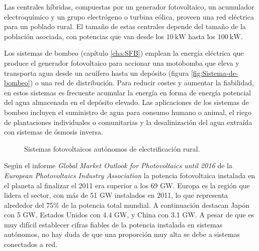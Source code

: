 Las centrales híbridas, compuestas por
un generador fotovoltaico, un acumulador electroquímico y un grupo
electrógeno o turbina eólica, proveen una red eléctrica para un poblado
rural. El tamaño de estas centrales depende del tamaño de la población
asociada, con potencias que van desde los $\SI{10}{\kilo\watt}$ hasta
los $\SI{100}{\kilo\watt}$. 

Los sistemas de bombeo (capítulo \ref{cha:SFB})
 emplean la energía eléctrica que produce el generador fotovoltaico
para accionar una motobomba que eleva y transporta agua desde un acuífero
hasta un depósito (figura \ref{fig:Sistema-de-bombeo}) o una red
de distribución. Para reducir costes y aumentar la fiabilidad, en
estos sistemas es frecuente acumular la energía en forma de energía
potencial del agua almacenada en el depósito elevado. Las aplicaciones
de los sistemas de bombeo incluyen el suministro de agua para consumo
humano o animal, el riego de plantaciones individuales o comunitarias
y la desalinización del agua extraída con sistemas de ósmosis inversa.

%
\begin{figure}

\caption{Sistemas fotovoltaicos autónomos de electrificación rural.}



\end{figure}


Según el informe \emph{Global Market Outlook for Photovoltaics until
2016} de la \emph{European Photovoltaics Industry Association}
\citep{EPIA2012} la potencia fotovoltaica instalada en el planeta
al finalizar el 2011 era superior a los 69 GW. Europa es la región
que lidera el sector, con más de 51 GW instalados en 2011, lo que
representa alrededor del 75\% de la potencia total mundial. A
continuación destacan Japón con 5 GW, Estados Unidos con 4.4 GW, y
China con 3.1 GW. A pesar de que es muy difícil establecer
cifras fiables de la potencia instalada en sistemas autónomos, no
hay duda de que una proporción muy alta se debe a sistemas conectados
a red. 

